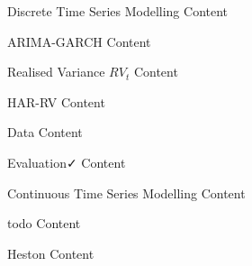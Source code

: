 \documentclass[
	landscape,       %
]{ImperialPoster}
\begin{document}
\medskip %


\begin{multicols}{3}

	\begin{description-section}{Discrete Time Series Modelling}
		Content
	\end{description-section}

	\begin{multicols}{2}

		\begin{model-section}{ARIMA-GARCH}
			Content
		\end{model-section}

		\columnbreak{}

		\begin{data-model-section}{Realised Variance $RV_{t}$}
			Content
		\end{data-model-section}

		\begin{model-section}{HAR-RV}
			Content
		\end{model-section}

	\end{multicols}

	\columnbreak{}

	\begin{main-section}{Data}{\faChartArea}
		Content
	\end{main-section}

	\begin{main-section}{Evaluation}{\faCheck}
		Content
	\end{main-section}

	\columnbreak{}

	\begin{description-section}{Continuous Time Series Modelling}
		Content
	\end{description-section}

	\begin{multicols}{2}

		\begin{data-model-section}{todo}
			Content
		\end{data-model-section}

		\begin{model-section}{Heston}
			Content
		\end{model-section}


\end{multicols}
\end{multicols}
\end{document}

